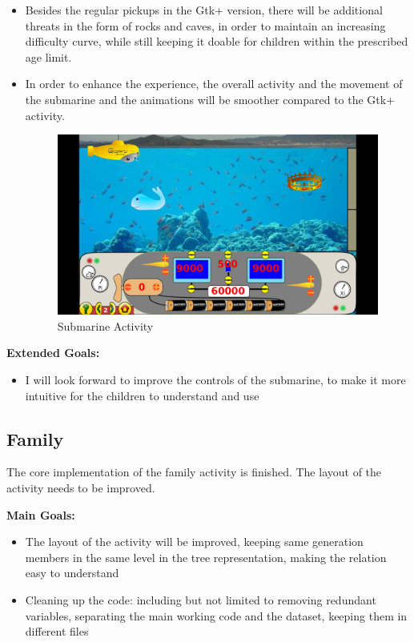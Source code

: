 \documentclass[preprint,12pt]{elsarticle}
\begin{document}
\begin{itemize}
\item Besides the regular pickups in the Gtk+ version, there will be additional threats in the form of rocks and caves, in order to maintain an increasing difficulty curve, while still keeping it doable for children within the prescribed age limit.

\item In order to enhance the experience, the overall activity and the movement of the submarine and the animations will be smoother compared to the Gtk+ activity.

\begin{figure}[H]
\centering\includegraphics[width=0.9\linewidth]{submarine}
\caption{Submarine Activity}
\end{figure}

\end{itemize}

\textbf{Extended Goals:}

\begin{itemize}

\item I will look forward to improve the controls of the submarine, to make it more intuitive for the children to understand and use

\end{itemize}

\subsection{Family}

The core implementation of the family activity is finished. The layout of the activity needs to be improved.

\textbf{Main Goals:}

\begin{itemize}
\item The layout of the activity will be improved, keeping same generation members in the same level in the tree representation, making the relation easy to understand
\item Cleaning up the code: including but not limited to removing redundant variables, separating the main working code and the dataset, keeping them in different files
\end{itemize}
\end{document}
